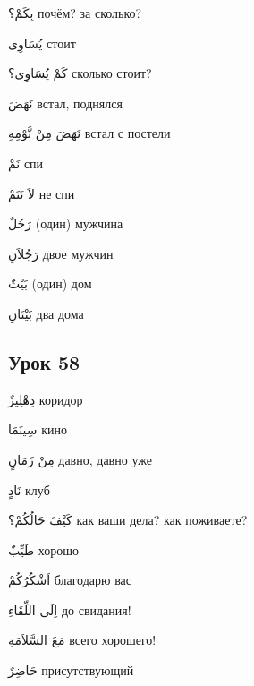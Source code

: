 \documentclass[a5paper]{article}
\newcommand\textstyleDropCaps[1]{#1}
\newcommand\textstyleCaptioncharacters[1]{#1}
\begin{document}
\textstyleCaptioncharacters{بِكَمْ؟ }\textstyleDropCaps{почём? за сколько?‎}

\textstyleCaptioncharacters{يُسَاوِى }\textstyleDropCaps{стоит‎}

\textstyleCaptioncharacters{كَمْ يُسَاوِى؟ }\textstyleDropCaps{сколько стоит?‎}

\textstyleCaptioncharacters{نَهَضَ }\textstyleDropCaps{встал, поднялся‎}

\textstyleCaptioncharacters{نَهَضَ مِنْ نَّوْمِهِ }\textstyleDropCaps{встал с постели‎}

\textstyleCaptioncharacters{نَمْ }\textstyleDropCaps{спи‎}

\textstyleCaptioncharacters{لاَ تَنَمْ }\textstyleDropCaps{не спи‎}

\textstyleCaptioncharacters{رَجُلٌ }\textstyleDropCaps{(один) мужчина‎}

\textstyleCaptioncharacters{رَجُلاَنِ }\textstyleDropCaps{двое мужчин‎}

\textstyleCaptioncharacters{بَيْتٌ }\textstyleDropCaps{(один) дом‎}

\textstyleCaptioncharacters{بَيْتَانِ }\textstyleDropCaps{два дома‎}

\subsection[Урок 58‎]{\textstyleDropCaps{Урок 58‎}}
\textstyleCaptioncharacters{دِهْلِيزٌ }\textstyleDropCaps{коридор‎}

\textstyleCaptioncharacters{سِينَمَا }\textstyleDropCaps{кино‎}

\textstyleCaptioncharacters{مِنْ زَمَانٍ }\textstyleDropCaps{давно, давно уже‎}

\textstyleCaptioncharacters{نَادٍ }\textstyleDropCaps{клуб‎}

\textstyleCaptioncharacters{كَيْفَ حَالُكُمْ؟ }\textstyleDropCaps{как ваши дела? как поживаете?‎}

\textstyleCaptioncharacters{طَيِّبٌ }\textstyleDropCaps{хорошо‎}

\textstyleCaptioncharacters{اَشْكُرُكُمْ }\textstyleDropCaps{благодарю вас‎}

\textstyleCaptioncharacters{اِلَى اللِّقَاءِ }\textstyleDropCaps{до свидания!‎}

\textstyleCaptioncharacters{مَعَ السَّلاَمَةِ }\textstyleDropCaps{всего хоро­шего!‎}

\textstyleCaptioncharacters{حَاضِرٌ }\textstyleDropCaps{присутствующий‎}
\end{document}
